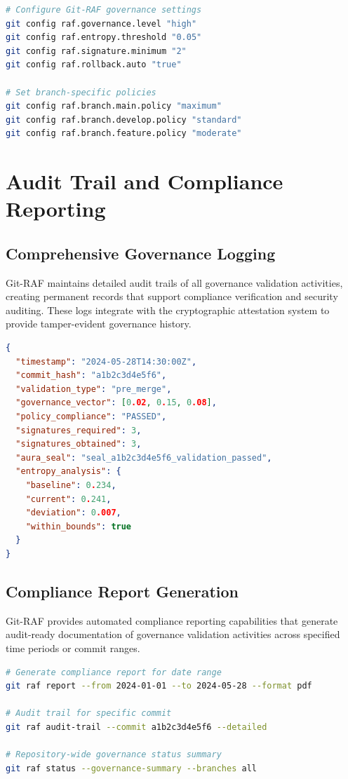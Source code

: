 \begin{lstlisting}[style=riftlang, language=bash]
# Configure Git-RAF governance settings
git config raf.governance.level "high"
git config raf.entropy.threshold "0.05"  
git config raf.signature.minimum "2"
git config raf.rollback.auto "true"

# Set branch-specific policies
git config raf.branch.main.policy "maximum"
git config raf.branch.develop.policy "standard"
git config raf.branch.feature.policy "moderate"
\end{lstlisting}

\section{Audit Trail and Compliance Reporting}

\subsection{Comprehensive Governance Logging}

Git-RAF maintains detailed audit trails of all governance validation activities, creating permanent records that support compliance verification and security auditing. These logs integrate with the cryptographic attestation system to provide tamper-evident governance history.

\begin{lstlisting}[style=riftlang, language=json]
{
  "timestamp": "2024-05-28T14:30:00Z",
  "commit_hash": "a1b2c3d4e5f6",
  "validation_type": "pre_merge",
  "governance_vector": [0.02, 0.15, 0.08],
  "policy_compliance": "PASSED",
  "signatures_required": 3,
  "signatures_obtained": 3,
  "aura_seal": "seal_a1b2c3d4e5f6_validation_passed",
  "entropy_analysis": {
    "baseline": 0.234,
    "current": 0.241,
    "deviation": 0.007,
    "within_bounds": true
  }
}
\end{lstlisting}

\subsection{Compliance Report Generation}

Git-RAF provides automated compliance reporting capabilities that generate audit-ready documentation of governance validation activities across specified time periods or commit ranges.

\begin{lstlisting}[style=riftlang, language=bash]
# Generate compliance report for date range
git raf report --from 2024-01-01 --to 2024-05-28 --format pdf

# Audit trail for specific commit
git raf audit-trail --commit a1b2c3d4e5f6 --detailed

# Repository-wide governance status summary  
git raf status --governance-summary --branches all
\end{lstlisting}


